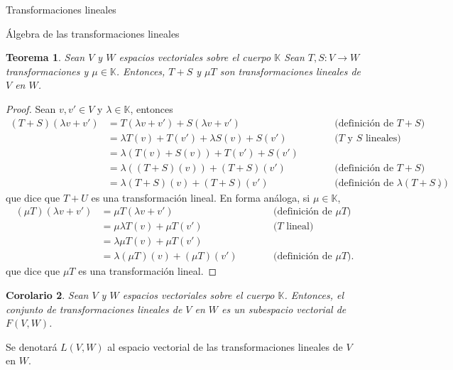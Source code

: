 \documentclass[a4paper,12pt,twoside,spanish]{amsbook}
\newtheorem{teorema}{Teorema}[section]
\newtheorem{corolario}[teorema]{Corolario}
\theoremstyle{definition}
\theoremstyle{remark}
\newcommand{\K}{\mathbb K}
\begin{document}
\begin{chapter}{Transformaciones lineales}
\begin{section}{Álgebra de las transformaciones lineales}
			\begin{teorema}
				Sean $V$ y $W$ espacios vectoriales sobre el cuerpo $\K$ Sean $T,S : V \to W$ transformaciones y $\mu \in \K$. Entonces, $T + S$ y $\mu T$ son transformaciones lineales de $V$ en $W$.
			\end{teorema}
			\begin{proof}
				Sean $v,v' \in V$ y $\lambda \in \K$, entonces
				\begin{equation*}
				\begin{array}{rlll}
					(T + S)(\lambda v + v') &= T(\lambda v + v') + S(\lambda v + v')&\qquad&\text{(definición de $T+S$)} \\
					&= \lambda T(v) + T(v') + \lambda S(v) + S(v')& &\text{($T$ y $S$ lineales)}\\
					&= \lambda (T(v) +S(v)) + T(v') + S(v')&&\text{}\\
					&= \lambda ((T+S)(v)) + (T + S) (v')& &\text{(definición de $T+S$)}\\
					&= \lambda(T + S)(v) +(T + S) (v')&&\text{(definición de $\lambda(T + S)$)}.
				\end{array}
				\end{equation*}
				que dice que $T + U$ es una transformación lineal. En forma análoga, si $\mu \in \K$, 
				\begin{equation*}
				\begin{array}{rlll}
				(\mu T)(\lambda v + v') &= \mu T(\lambda v + v')&\qquad&\text{(definición de $\mu T$)} \\
				&= \mu \lambda T(v) + \mu T(v') &\qquad&\text{($T$ lineal)}\\
				&=  \lambda \mu T(v) + \mu T(v')&\qquad&\text{}\\
				&= \lambda (\mu T)(v) + (\mu T)(v') &\qquad&\text{(definición de $\mu T$)}.
				\end{array}
				\end{equation*}
				que dice que $\mu T$ es una transformación lineal.
			\end{proof}
			
		\begin{corolario}
			Sean $V$ y $W$ espacios vectoriales sobre el cuerpo $\K$. Entonces, el conjunto de transformaciones lineales de $V$ en $W$ es un subespacio vectorial  de $F(V,W)$. 
		\end{corolario} 	
			
		Se denotará  $L(V,W)$ al espacio vectorial de las transformaciones lineales de $V$ en $W$.
		

\end{section}
\end{chapter}
\end{document}
